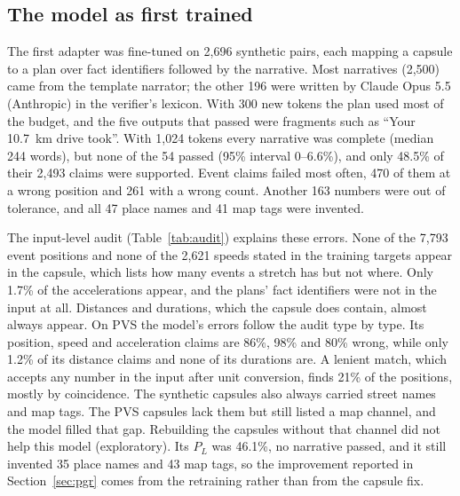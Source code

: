 \subsection{The model as first trained}
\label{sec:bench}
The first adapter was fine-tuned on 2{,}696 synthetic pairs, each mapping a capsule to a plan over fact identifiers followed by the narrative.
Most narratives (2{,}500) came from the template narrator; the other 196 were written by Claude Opus 5.5 (Anthropic) in the verifier's lexicon.
With 300 new tokens the plan used most of the budget, and the five outputs that passed were fragments such as ``Your 10.7~km drive took''.
With 1{,}024 tokens every narrative was complete (median 244 words), but none of the 54 passed (95\% interval 0--6.6\%), and only 48.5\% of their 2{,}493 claims were supported.
Event claims failed most often, 470 of them at a wrong position and 261 with a wrong count. Another 163 numbers were out of tolerance, and all 47 place names and 41 map tags were invented.

The input-level audit (Table~\ref{tab:audit}) explains these errors.
None of the 7{,}793 event positions and none of the 2{,}621 speeds stated in the training targets appear in the capsule, which lists how many events a stretch has but not where. Only 1.7\% of the accelerations appear, and the plans' fact identifiers were not in the input at all.
Distances and durations, which the capsule does contain, almost always appear.
On PVS the model's errors follow the audit type by type. Its position, speed and acceleration claims are 86\%, 98\% and 80\% wrong, while only 1.2\% of its distance claims and none of its durations are.
A lenient match, which accepts any number in the input after unit conversion, finds 21\% of the positions, mostly by coincidence.
The synthetic capsules also always carried street names and map tags. The PVS capsules lack them but still listed a map channel, and the model filled that gap.
Rebuilding the capsules without that channel did not help this model (exploratory). Its $P_L$ was 46.1\%, no narrative passed, and it still invented 35 place names and 43 map tags, so the improvement reported in Section~\ref{sec:pgr} comes from the retraining rather than from the capsule fix.

